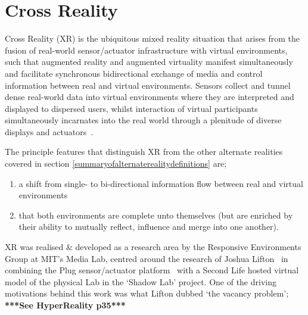 
%


\section{Cross Reality}

Cross Reality (XR) is the ubiquitous mixed reality situation that arises from the fusion of real-world sensor/actuator infrastructure with virtual environments, such that augmented reality and augmented virtuality manifest simultaneously and facilitate synchronous bidirectional exchange of media and control information between real and virtual environments. Sensors collect and tunnel dense real-world data into virtual environments where they are interpreted and displayed to dispersed users, whilst interaction of virtual participants simultaneously incarnates into the real world through a plenitude of diverse displays and actuators~\cite{Paradiso2009}.

The principle features that distinguish XR from the other alternate realities covered in section \ref{summaryofalternaterealitydefinitions} are;
\begin{enumerate}
	\item a shift from single- to bi-directional information flow between real and virtual environments~\cite{kim:practical}
	\item that both environments are complete unto themselves (but are enriched by their ability to mutually reflect, influence and merge into one another).~\cite{lifton:merging}
\end{enumerate}


XR was realised \& developed as a research area by the Responsive Environments Group at MIT's Media Lab, centred around the research of Joshua Lifton~\cite{Lifton2007a} in combining the Plug sensor/actuator platform~\cite{Lifton2007b} with a Second Life hosted virtual model of the physical Lab in the `Shadow Lab' project. One of the driving motivations behind this work was what Lifton dubbed `the vacancy problem'; \textbf{***See HyperReality p35***}

